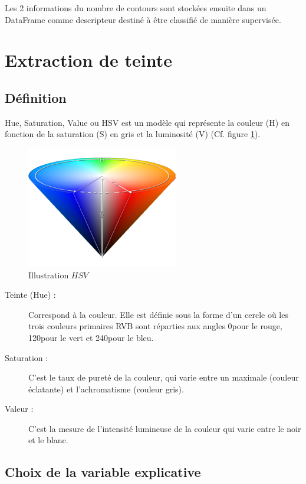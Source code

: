 \documentclass{book}
\begin{document}
Les 2 informations du nombre de contours sont stockées ensuite dans un DataFrame comme descripteur
destiné à être classifié de manière supervisée.

\section{Extraction de teinte}
\subsection{Définition}
Hue, Saturation, Value ou HSV est un modèle qui représente la couleur (H) en fonction de la saturation (S) en gris et la luminosité (V) (Cf. figure \ref{HSV}).
\begin{figure}[H]
\begin{center}
\includegraphics[scale=0.5]{hue.jpg}
\end{center}
\caption{Illustration $HSV$ \cite{wiki:hsv}}
\label{HSV}
\end{figure}
\begin{description}
\item[Teinte (Hue) :] Correspond à la couleur. Elle est définie sous la forme
d'un cercle où les trois couleurs primaires RVB sont
réparties aux angles 0\degre pour le rouge, 120\degre pour le vert
et 240\degre pour le bleu.
\item[Saturation :] C’est le taux de pureté de la couleur, qui varie entre un
maximale (couleur éclatante) et l’achromatisme (couleur
gris).
\item[Valeur :]  C’est la mesure de l’intensité lumineuse de la couleur
qui varie entre le noir et le blanc.
\end{description}

\subsection{Choix de la variable explicative}
\end{document}
